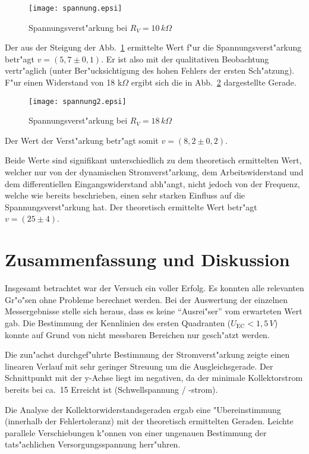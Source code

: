\documentclass[a4paper,10pt]{article}
\begin{document}
\begin{figure}[htb]
	\centering
	\texttt{[image: spannung.epsi]}
	\caption{Spannungsverst"arkung bei $R_V=10 \, k\Omega$}
	\label{span1}
\end{figure}

Der aus der Steigung der Abb.~\ref{span1} ermittelte Wert f"ur die Spannungsverst"arkung betr"agt $v=(5,7 \pm 0,1)$. Er ist also mit der qualitativen Beobachtung vertr"aglich (unter Ber"ucksichtigung des hohen Fehlers der ersten Sch"atzung). F"ur einen Widerstand von 18 k$\Omega$ ergibt sich die in Abb.~\ref{span2} dargestellte Gerade.

\begin{figure}[htb]
	\centering
	\texttt{[image: spannung2.epsi]}
	\caption{Spannungsverst"arkung bei $R_V=18 \, k\Omega$}
	\label{span2}
\end{figure}

Der Wert der Verst"arkung betr"agt somit $v=(8,2 \pm 0,2)$.

Beide Werte sind signifikant unterschiedlich zu dem theoretisch ermittelten Wert, welcher nur von der dynamischen Stromverst"arkung, dem Arbeitswiderstand und dem differentiellen Eingangswiderstand abh"angt, nicht jedoch von der Frequenz, welche wie bereits beschrieben, einen sehr starken Einfluss auf die Spannungsverst"arkung hat. Der theoretisch ermittelte Wert betr"agt $v=(25 \pm 4)$.

\section{Zusammenfassung und Diskussion}
Insgesamt betrachtet war der Versuch ein voller Erfolg. Es konnten alle relevanten Gr"o"sen ohne Probleme berechnet werden. Bei der Auswertung der einzelnen Messergebnisse stelle sich heraus, dass es keine "`Ausrei"ser"' vom erwarteten Wert gab. Die Bestimmung der Kennlinien des ersten Quadranten ($U_\text{EC}<1,5 \, V$) konnte auf Grund von nicht messbaren Bereichen nur gesch"atzt werden.

Die zun"achst durchgef"uhrte Bestimmung der Stromverst"arkung zeigte einen linearen Verlauf mit sehr geringer Streuung um die Ausgleichsgerade. Der Schnittpunkt mit der y-Achse liegt im negativen, da der minimale Kollektorstrom bereits bei ca.~\unit{15}{\mu\ampere} Erreicht ist (Schwellspannung / -strom).

Die Analyse der Kollektorwiderstandsgeraden ergab eine "Ubereinstimmung (innerhalb der Fehlertoleranz) mit der theoretisch ermittelten Geraden. Leichte parallele Verschiebungen k"onnen von einer ungenauen Bestimmung der tats"achlichen Versorgungsspannung herr"uhren.
\end{document}

